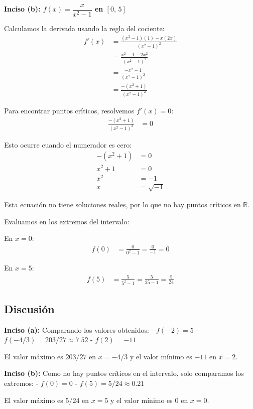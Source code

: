 \documentclass{article}
\begin{document}
\textbf{Inciso (b): $f(x) = \dfrac{x}{x^{2}-1}$ en $[0,\,5]$}

Calculamos la derivada usando la regla del cociente:
\begin{align}
f'(x) &= \frac{(x^{2}-1)(1) - x(2x)}{(x^{2}-1)^{2}} \\
&= \frac{x^{2} - 1 - 2x^{2}}{(x^{2}-1)^{2}} \\
&= \frac{-x^{2} - 1}{(x^{2}-1)^{2}} \\
&= \frac{-(x^{2} + 1)}{(x^{2}-1)^{2}}
\end{align}

Para encontrar puntos críticos, resolvemos $f'(x) = 0$:
\begin{align}
\frac{-(x^{2} + 1)}{(x^{2}-1)^{2}} &= 0
\end{align}

Esto ocurre cuando el numerador es cero:
\begin{align}
-(x^{2} + 1) &= 0 \\
x^{2} + 1 &= 0 \\
x^{2} &= -1 \\
x &= \sqrt{-1}
\end{align}

Esta ecuación no tiene soluciones reales, por lo que no hay puntos críticos en $\mathbb{R}$.

Evaluamos en los extremos del intervalo:

En $x = 0$:
\begin{align}
f(0) &= \frac{0}{0^{2} - 1} = \frac{0}{-1} = 0
\end{align}

En $x = 5$:
\begin{align}
f(5) &= \frac{5}{5^{2} - 1} = \frac{5}{25 - 1} = \frac{5}{24}
\end{align}

\subsection{Discusión}

\textbf{Inciso (a):} 
Comparando los valores obtenidos:
- $f(-2) = 5$
- $f(-4/3) = 203/27 \approx 7.52$  
- $f(2) = -11$

El valor máximo es $203/27$ en $x = -4/3$ y el valor mínimo es $-11$ en $x = 2$.

\textbf{Inciso (b):}
Como no hay puntos críticos en el intervalo, solo comparamos los extremos:
- $f(0) = 0$
- $f(5) = 5/24 \approx 0.21$

El valor máximo es $5/24$ en $x = 5$ y el valor mínimo es $0$ en $x = 0$.
\end{document}
